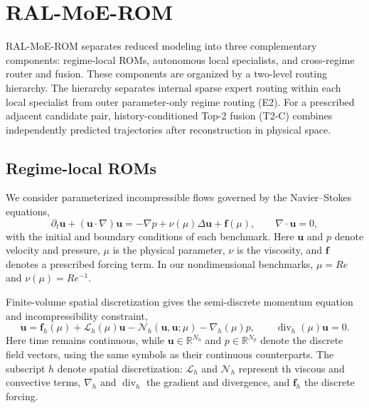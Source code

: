 \section{RAL-MoE-ROM}
\label{sec:method}

RAL-MoE-ROM separates reduced modeling into three complementary components: regime-local ROMs, autonomous local specialists, and cross-regime router and fusion. These components are organized by a two-level routing hierarchy.  The hierarchy separates internal sparse expert routing within each local specialist from outer parameter-only regime routing (E2). For a prescribed adjacent candidate pair, history-conditioned Top-2 fusion (T2-C) combines independently predicted trajectories after reconstruction in physical space.
\subsection{Regime-local ROMs}
\label{sec:local_roms}

We consider parameterized incompressible flows governed by the
Navier--Stokes equations,
\begin{equation}
  \partial_t\bm u+(\bm u\cdot\nabla)\bm u
  =-\nabla p+\nu(\mu)\Delta\bm u+\bm f(\mu),
  \qquad \nabla\cdot\bm u=0,
  \label{eq:main_ns}
\end{equation}
with the initial and boundary conditions of each benchmark. Here $\bm u$ and $p$ denote velocity and pressure, $\mu$ is the physical parameter, $\nu$ is the viscosity, and $\bm f$ denotes a prescribed forcing term. In our nondimensional benchmarks, $\mu=Re$ and $\nu(\mu)=Re^{-1}$.

Finite-volume spatial discretization gives the semi-discrete momentum equation and incompressibility constraint,
\begin{equation}
  \dot{\bm u}
  =\bm f_h(\mu)+\mathcal L_h(\mu)\bm u
  -\mathcal N_h(\bm u,\bm u;\mu)-\nabla_h(\mu)p,
  \qquad \operatorname{div}_h(\mu)\bm u=0.
  \label{eq:main_semidiscrete}
\end{equation}
Here time remains continuous, while $\bm u\in\mathbb R^{N_u}$ and $p\in\mathbb R^{N_p}$ denote the discrete field vectors, using the same symbols as their continuous counterparts. The subscript $h$ denote spatial discretization: $\mathcal L_h$ and $\mathcal N_h$ represent th viscous and convective terms, $\nabla_h$ and $\operatorname{div}_h$ the gradient and divergence, and $\bm f_h$ the discrete forcing.

